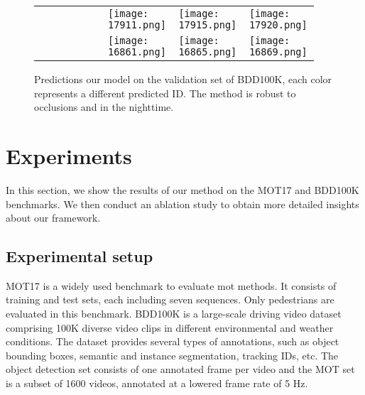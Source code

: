 \begin{figure*}[t]
\setlength\tabcolsep{1pt} 
\centering
\begin{tabular}{@{} r M{0.31\linewidth} M{0.31\linewidth} M{0.31\linewidth} @{}}
    \begin{subfigure}{0.03\linewidth} \caption{}\label{subfig:bdd100k_vid1_c_main-paper} \end{subfigure} 
      & \texttt{[image: 17911.png]} 
      & \texttt{[image: 17915.png]}
      & \texttt{[image: 17920.png]}\\ \addlinespace
    \begin{subfigure}{0.03\linewidth} \caption{}\label{subfig:bdd100k_vid1_b_main-paper} \end{subfigure} 
      & \texttt{[image: 16861.png]} 
      & \texttt{[image: 16865.png]}
      & \texttt{[image: 16869.png]}\\ 
\end{tabular}
   \caption{Predictions our model on the validation set of BDD100K, each color represents a different predicted ID. The method is robust to occlusions and in the nighttime.}
   \label{fig:bdd100k_qualitative}
   \vspace{-1.5em}
\end{figure*}

\section{Experiments}

In this section, we show the results of our method on the MOT17 \cite{MOT16} and BDD100K \cite{bdd100k} benchmarks. We then conduct an ablation study to obtain more detailed insights about our framework.

\subsection{Experimental setup}
\label{sec:experimental-setup}

 MOT17 \cite{MOT16} is a widely used benchmark to evaluate \ac{mot} methods. It consists of training and test sets, each including seven sequences. Only pedestrians are evaluated in this benchmark.
\noindent BDD100K \cite{bdd100k} is a large-scale driving video dataset comprising 100K diverse video clips in different environmental and weather conditions. The dataset provides several types of annotations, such as object bounding boxes, semantic and instance segmentation, tracking IDs, etc. 
The object detection set consists of one annotated frame per video and the MOT set is a subset of 1600 videos, annotated at a lowered frame rate of 5 Hz.

